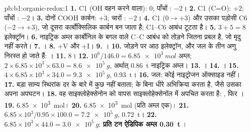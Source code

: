 \begin{solution}{pb:b1:organic-redox:1}
\textbf{1.} C1 (OH वहन करने वाला): 0; पाँचों : $-2$।
\textbf{2.} C1 (C=O): $+2$; पाँचों : $-2$।
\textbf{3.} दोनों COOH कार्बन: $+3$; चारों : $-2$।
\textbf{4.} C1 ($0 \to +3$) और उसका पड़ोसी C6 ($-2 \to +3$), जो
दूसरा कार्बोक्सिलिक कार्बन बन जाता है; C1--C6 आबंध टूटता है।
\textbf{5.} $3 + 5 = 8$ इलेक्ट्रॉन।
\textbf{6.} नाइट्रिक अम्ल कार्बोनिल के बगल वाले C--C आबंध को तोड़ने
जितना प्रबल है, जो मृदु  नहीं करते।
\textbf{7.} ।
\textbf{8.} $+$V और $+$I।
\textbf{9.} ।
\textbf{10.} जोड़ने पर आठ इलेक्ट्रॉन,  और जल के तीन अणु
निरस्त हो जाते हैं: ।
\textbf{11.} 8।
\textbf{12.} $10^6/146.0 = \qty{6.85e3}{mol}$ अम्ल; $2 \times 6.85 \times
10^3 \times 63.0 = \qty{8.6e5}{g}$, अर्थात् \qty{0.86}{t} नाइट्रिक अम्ल।
\textbf{13.} ।
\textbf{14.} ।
\textbf{15.} $4 \times 6.85 \times 10^3 \times 34.0 = \qty{9.3e5}{g}$,
\qty{0.93}{t}।
\textbf{16.} जल: कोई नाइट्रोजन ऑक्साइड नहीं।
\textbf{17.} बड़ा साम्य स्थिरांक दर के बारे में कुछ नहीं बताता;
  के बिना धीरे अभिक्रिया करता है, जैसे उसका अपना अपघटन।
\textbf{18.} वह साइक्लोहेक्सेनोन को वापस साइक्लोहेक्सेनॉल में अपचित करता है:
, फिर
।
\textbf{19.} \qty{6.85e3}{mol}।
\textbf{20.} \qty{6.85e3}{mol}  (प्रति अम्ल एक)।
\textbf{21.} $6.85 \times 10^3/0.95 \times 100.0 = \qty{7.2e5}{g}$, \qty{0.72}{t}।
\textbf{22.} $6.85 \times 10^3 \times 44.0 = \qty{3.0e5}{g}$: \textbf{प्रति टन ऐडिपिक अम्ल
\qty{0.30}{t} }।
\end{solution}
